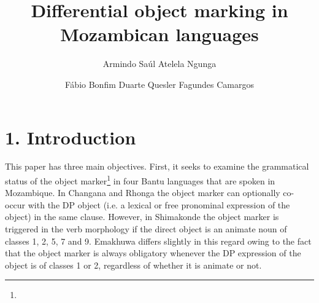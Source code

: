 \documentclass[output=paper]{langsci/langscibook}
\title{Differential object marking in Mozambican languages}
\author{%
Armindo Saúl Atelela Ngunga\affiliation{University of Eduardo Mondlane}\and 
Fábio Bonfim Duarte\affiliation{Federal University of Minas Gerais}\lastand 
 Quesler Fagundes Camargos \affiliation{Federal University of Rondônia}
}
\begin{document}
 

 

 

 

 


 
 

\section{ 1. Introduction}

This paper has three main objectives. First, it seeks to examine the grammatical status of the object marker\footnote{} in four Bantu languages that are spoken in Mozambique. In Changana and Rhonga the object marker can optionally co-occur with the DP object (i.e. a lexical or free pronominal expression of the object) in the same clause. However, in Shimakonde the object marker is triggered in the verb morphology if the direct object is an animate noun of classes 1, 2, 5, 7 and 9. Emakhuwa differs slightly in this regard owing to the fact that the object marker is always obligatory whenever the DP expression of the object is of classes 1 or 2, regardless of whether it is animate or not.
\end{document}
